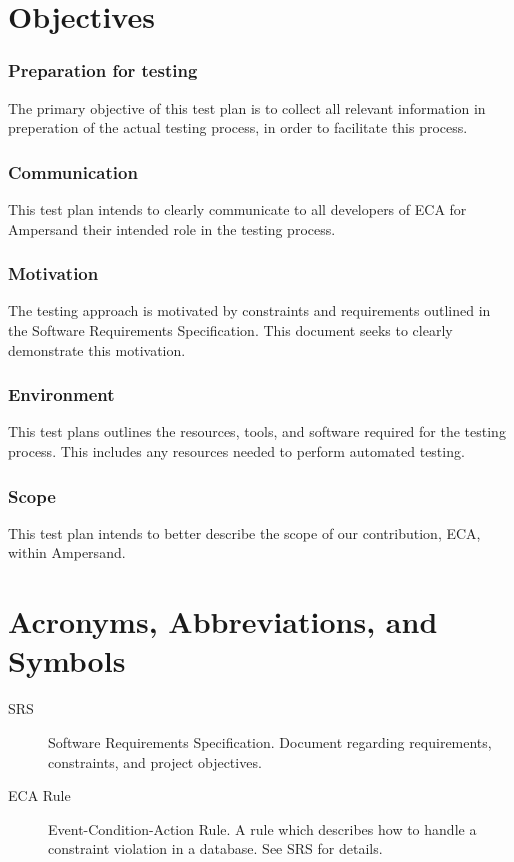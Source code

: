 \documentclass[12pt]{report}
\begin{document}
\section{Objectives}
\subsubsection*{Preparation for testing}
The primary objective of this test plan is to collect all relevant information
in preperation of the actual testing process, in order to facilitate this process.

\subsubsection*{Communication}
This test plan intends to clearly communicate to all developers of ECA for Ampersand 
their intended role in the testing process. 

\subsubsection*{Motivation}
The testing approach is motivated by constraints and requirements outlined in the
Software Requirements Specification. This document seeks to clearly demonstrate
this motivation.

\subsubsection*{Environment}
This test plans outlines the resources, tools, and software required for the
testing process. This includes any resources needed to perform automated testing. 

\subsubsection*{Scope}
This test plan intends to better describe the scope of our contribution, ECA,
within Ampersand. 

\section{Acronyms, Abbreviations, and Symbols}

\begin{description}
\item[SRS] Software Requirements Specification. Document regarding requirements, constraints, and project objectives.
\item[ECA Rule] Event-Condition-Action Rule. A rule which describes how to
  handle a constraint violation in a database. See SRS for details.
\end{description}
\end{document}
